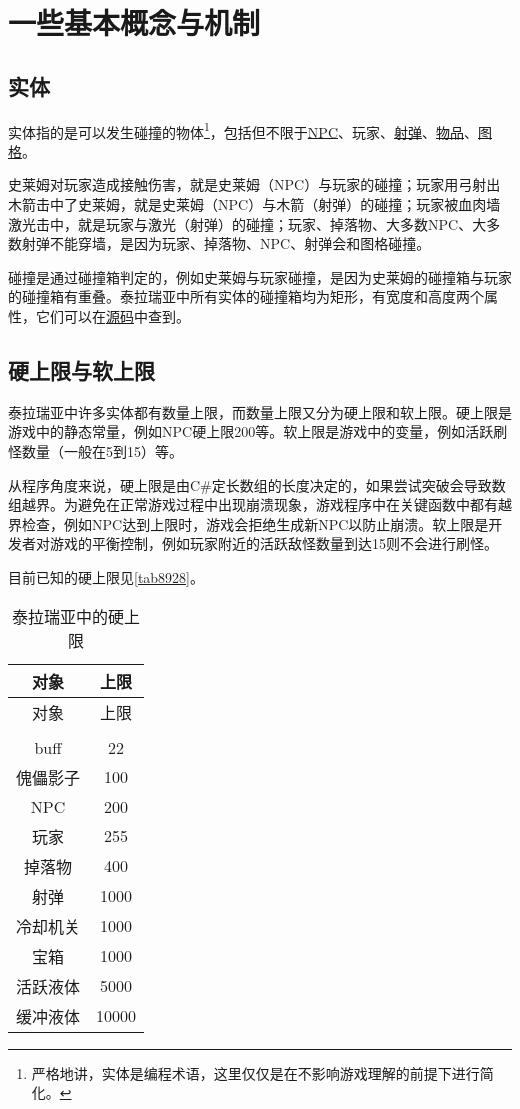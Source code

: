 \section{一些基本概念与机制}

\subsection{实体}
实体指的是可以发生碰撞的物体\footnote{严格地讲，实体是编程术语，这里仅仅是在不影响游戏理解的前提下进行简化。}，包括但不限于\href{https://terraria.gamepedia.com/NPC_IDs}{NPC}、玩家、\href{https://terraria.gamepedia.com/Projectile_IDs}{射弹}、\href{https://terraria.gamepedia.com/Item_IDs}{物品}、\href{https://terraria.gamepedia.com/Tile_IDs}{图格}。

史莱姆对玩家造成接触伤害，就是史莱姆（NPC）与玩家的碰撞；玩家用弓射出木箭击中了史莱姆，就是史莱姆（NPC）与木箭（射弹）的碰撞；玩家被血肉墙激光击中，就是玩家与激光（射弹）的碰撞；玩家、掉落物、大多数NPC、大多数射弹不能穿墙，是因为玩家、掉落物、NPC、射弹会和图格碰撞。

碰撞是通过碰撞箱判定的，例如史莱姆与玩家碰撞，是因为史莱姆的碰撞箱与玩家的碰撞箱有重叠。泰拉瑞亚中所有实体的碰撞箱均为矩形，有宽度和高度两个属性，它们可以在\hyperref[app8]{源码}中查到。

\subsection{硬上限与软上限}
泰拉瑞亚中许多实体都有数量上限，而数量上限又分为硬上限和软上限。硬上限是游戏中的静态常量，例如NPC硬上限200等。软上限是游戏中的变量，例如活跃刷怪数量（一般在5到15）等。

从程序角度来说，硬上限是由C\#定长数组的长度决定的，如果尝试突破会导致数组越界。为避免在正常游戏过程中出现崩溃现象，游戏程序中在关键函数中都有越界检查，例如NPC达到上限时，游戏会拒绝生成新NPC以防止崩溃。软上限是开发者对游戏的平衡控制，例如玩家附近的活跃敌怪数量到达15则不会进行刷怪。

目前已知的硬上限见\autoref{tab8928}。
\begin{longtable}{|c|c|}
\caption{泰拉瑞亚中的硬上限}\label{tab8928}\\\hline
对象&上限\\\hline
\endfirsthead
\hline 对象&上限\\\hline
\endhead
\\\hline
\endfoot
buff&22\\\hline
傀儡影子&100\\\hline
NPC&200\\\hline
玩家&255\\\hline
掉落物&400\\\hline
射弹&1000\\\hline
冷却机关&1000\\\hline
宝箱&1000\\\hline
活跃液体&5000\\\hline
缓冲液体&10000
\end{longtable}

